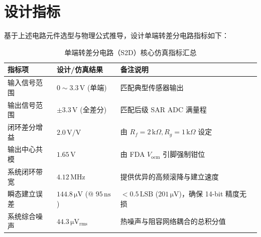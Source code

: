 \section{设计指标}
基于上述电路元件选型与物理公式推导，设计单端转差分电路指标如下：
\begin{table}[H]
\centering
\caption{单端转差分电路（S2D）核心仿真指标汇总}
\label{tab:s2d_final_specs}
\begin{tabular}{lll}
\toprule
\textbf{指标项} & \textbf{设计/仿真结果} & \textbf{备注说明} \\
\midrule
输入信号范围 & $0 \sim 3.3\,\mathrm{V}$ (单端) & 匹配典型传感器输出 \\
输出信号范围 & $\pm 3.3\,\mathrm{V}$ (全差分) & 匹配后级 SAR ADC 满量程 \\
闭环差分增益 & $2.0\,\mathrm{V/V}$ & 由 $R_f = 2\,\mathrm{k}\Omega, R_g = 1\,\mathrm{k}\Omega$ 设定 \\
输出中心共模 & $1.65\,\mathrm{V}$ & 由 FDA $V_{\mathrm{ocm}}$ 引脚强制钳位 \\
系统闭环带宽 & $4.12\,\mathrm{MHz}$ & 提供优异的高频滚降与建立速度 \\
瞬态建立误差 & $144.8\,\mathrm{\mu V}$ (@ $95\,\mathrm{ns}$) & $< 0.5\,\mathrm{LSB}$ ($201\,\mathrm{\mu V}$)，确保 14-bit 精度无损 \\
系统综合噪声 & $44.3\,\mathrm{\mu V_{rms}}$ & 热噪声与阻容网络耦合的总积分值 \\
\bottomrule
\end{tabular}
\end{table}